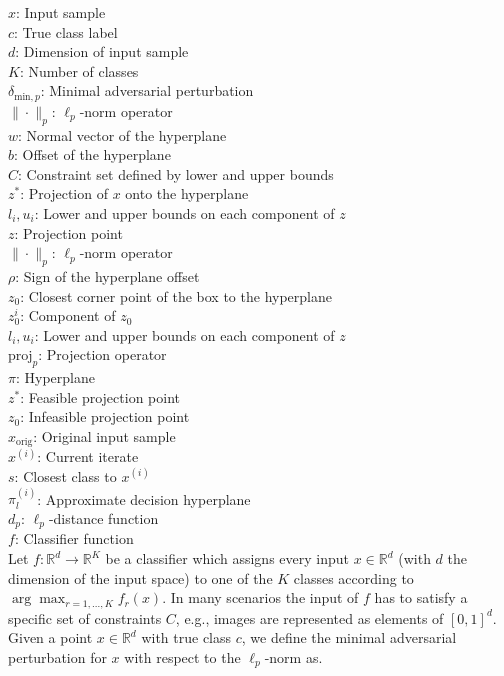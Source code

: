$x$: Input sample \\
$c$: True class label \\
$d$: Dimension of input sample \\
$K$: Number of classes \\
$\delta_{\text{min},p}$: Minimal adversarial perturbation \\
$\|\cdot\|_p$: $\ell_p$-norm operator\\
$w$: Normal vector of the hyperplane \\
$b$: Offset of the hyperplane \\
$C$: Constraint set defined by lower and upper bounds \\
$z^*$: Projection of $x$ onto the hyperplane \\
$l_i, u_i$: Lower and upper bounds on each component of $z$ \\
$z$: Projection point \\
$\|\cdot\|_p$: $\ell_p$-norm operator\\
$\rho$: Sign of the hyperplane offset \\
$z_0$: Closest corner point of the box to the hyperplane \\
$z_0^i$: Component of $z_0$ \\
$l_i, u_i$: Lower and upper bounds on each component of $z$ \\
$\text{proj}_p$: Projection operator \\
$\pi$: Hyperplane \\
$z^*$: Feasible projection point \\
$z_0$: Infeasible projection point\\
$x_{\text{orig}}$: Original input sample \\
$x^{(i)}$: Current iterate \\
$s$: Closest class to $x^{(i)}$ \\
$\pi_l^{(i)}$: Approximate decision hyperplane \\
$d_p$: $\ell_p$-distance function \\
$f$: Classifier function\\
Let $f : \mathbb{R}^d \to \mathbb{R}^K$ be a classifier which assigns every input $x \in \mathbb{R}^d$ (with $d$ the dimension of the input space) to one of the $K$ classes according to $\arg \max_{r=1,...,K} f_r(x)$. In many scenarios the input of $f$ has to satisfy a specific set of constraints $C$, e.g., images are represented as elements of $[0, 1]^d$. Given a point $x \in \mathbb{R}^d$ with true class $c$, we define the minimal adversarial perturbation for $x$ with respect to the $\ell_p$-norm as.

